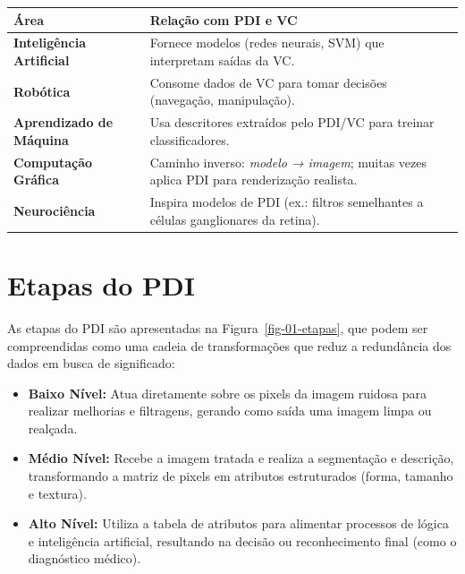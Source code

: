 \documentclass[
  portuguese,
  letterpaper,
  openany,
  oneside,
  12pt,
  a4paper]{book}
\providecommand{\tightlist}{%
  \setlength{\itemsep}{0pt}\setlength{\parskip}{0pt}}
\begin{document}
\begin{longtable}[]{@{}
  >{\raggedright\arraybackslash}p{}
  >{\raggedright\arraybackslash}p{}@{}}
\toprule\noalign{}
\begin{minipage}[b]{\linewidth}\raggedright
Área
\end{minipage} & \begin{minipage}[b]{\linewidth}\raggedright
Relação com PDI e VC
\end{minipage} \\
\midrule\noalign{}
\endhead
\bottomrule\noalign{}
\endlastfoot
\textbf{Inteligência Artificial} & Fornece modelos (redes neurais, SVM)
que interpretam saídas da VC. \\
\textbf{Robótica} & Consome dados de VC para tomar decisões (navegação,
manipulação). \\
\textbf{Aprendizado de Máquina} & Usa descritores extraídos pelo PDI/VC
para treinar classificadores. \\
\textbf{Computação Gráfica} & Caminho inverso: \emph{modelo → imagem};
muitas vezes aplica PDI para renderização realista. \\
\textbf{Neurociência} & Inspira modelos de PDI (ex.: filtros semelhantes
a células ganglionares da retina). \\
\end{longtable}

\section{Etapas do PDI}\label{etapas-do-pdi}

As etapas do PDI são apresentadas na Figura~\ref{fig-01-etapas}, que
podem ser compreendidas como uma cadeia de transformações que reduz a
redundância dos dados em busca de significado:

\begin{itemize}
\tightlist
\item
  \textbf{Baixo Nível:} Atua diretamente sobre os pixels da imagem
  ruidosa para realizar melhorias e filtragens, gerando como saída uma
  imagem limpa ou realçada.
\item
  \textbf{Médio Nível:} Recebe a imagem tratada e realiza a segmentação
  e descrição, transformando a matriz de pixels em atributos
  estruturados (forma, tamanho e textura).
\item
  \textbf{Alto Nível:} Utiliza a tabela de atributos para alimentar
  processos de lógica e inteligência artificial, resultando na decisão
  ou reconhecimento final (como o diagnóstico médico).
\end{itemize}
\end{document}
